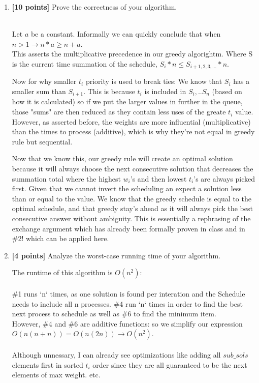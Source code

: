 \documentclass[11pt]{article}
\theoremstyle{definition}
\theoremstyle{theorem}
\newcommand{\solution}{\medskip\noindent{\color{DarkBlue}\textbf{Solution:}}}
\begin{document}
\begin{enumerate}[label=(\alph*)]
\item \textbf{[10 points]} Prove the correctness of your algorithm.

\solution \\

Let $a$ be a constant. Informally we can quickly conclude that when $n > 1 \rightarrow n * a \ge n + a$.\\
This asserts the multiplicative precedence in our greedy algorightm. Where S is the current time summation of the schedule,
$S_i * n \le S_{i+1,2,3,...} * n$. 

Now for why smaller $t_i$ priority is used to break ties: We know that $S_i$ has a smaller sum than $S_{i+1}$. 
This is because $t_i$ is included in $S_i,.. S_n$ (based on how it is calculated) so if we put the larger values in further in the queue, those "sums" are then
reduced as they contain less uses of the greate $t_i$ value. However, as asserted before, the weights are more influential (multiplicative) than the times to process (additive),
which is why they're not equal in greedy rule but sequential.

Now that we know this, our greedy rule will create an optimal solution because it will always choose the next 
consecutive solution that decreases the summation total where the highest $w_i$'s and then lowest $t_i$'s are always picked first.
Given that we cannot invert the scheduling an expect a solution less than or equal to the value. We know that
the greedy schedule is equal to the optimal schedule, and that greedy stay's ahead as it will always pick the best consecutive answer without ambiguity. 
This is essentially a rephrasing of the exchange argument which has already been formally proven in class and in \#2! which can be applied here.


\item \textbf{[4 points]}  Analyze the worst-case running time of your algorithm.

\solution

The runtime of this algorithm is $O(n^2)$:\\\\
\#1 runs `n` times, as one solution is found per interation and the Schedule needs to include all n processes.
\#4 run `n` times in order to find the best next process to schedule as well as \#6 to find the minimum item.
\\However, \#4 and \#6 are additive functions: so we simplify our expression $O(n(n+n)) = O(n(2n)) \rightarrow O(n^2)$.
\\\\Although unnessary, I can already see optimizations like adding all $sub\_sols$ elements first in sorted $t_i$ 
order since they are all guaranteed to be the next elements of max weight. etc.\\



\end{enumerate}
\end{document}
